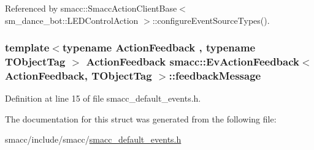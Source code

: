 Referenced by smacc\+::\+Smacc\+Action\+Client\+Base$<$ sm\+\_\+dance\+\_\+bot\+::\+L\+E\+D\+Control\+Action $>$\+::configure\+Event\+Source\+Types().

\subsubsection[{\texorpdfstring{feedback\+Message}{feedbackMessage}}]{\setlength{\rightskip}{0pt plus 5cm}template$<$typename Action\+Feedback , typename T\+Object\+Tag $>$ Action\+Feedback {\bf smacc\+::\+Ev\+Action\+Feedback}$<$ Action\+Feedback, T\+Object\+Tag $>$\+::feedback\+Message}\hypertarget{structsmacc_1_1EvActionFeedback_ae00f5e85eb9cec0d02ca394460d60015}{}\label{structsmacc_1_1EvActionFeedback_ae00f5e85eb9cec0d02ca394460d60015}


Definition at line 15 of file smacc\+\_\+default\+\_\+events.\+h.



The documentation for this struct was generated from the following file\+:\begin{DoxyCompactItemize}
\item 
smacc/include/smacc/\hyperlink{smacc__default__events_8h}{smacc\+\_\+default\+\_\+events.\+h}\end{DoxyCompactItemize}
